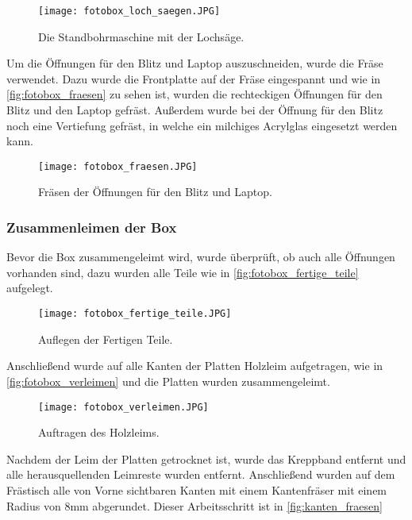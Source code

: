 \begin{figure}[H]
    \centering
    \texttt{[image: fotobox\_loch\_saegen.JPG]}
    \caption{Die Standbohrmaschine mit der Lochsäge.}
    \label{fig:fotobox_loch_saegen}
\end{figure}

Um die Öffnungen für den Blitz und Laptop auszuschneiden, wurde die Fräse verwendet.
Dazu wurde die Frontplatte auf der Fräse eingespannt und wie in
\autoref{fig:fotobox_fraesen} zu sehen ist, wurden die rechteckigen Öffnungen
für den Blitz und den Laptop gefräst. Außerdem wurde bei der Öffnung für den Blitz
noch eine Vertiefung gefräst, in welche ein milchiges Acrylglas eingesetzt werden kann.

\begin{figure}[H]
    \centering
    \texttt{[image: fotobox\_fraesen.JPG]}
    \caption{Fräsen der Öffnungen für den Blitz und Laptop.}
    \label{fig:fotobox_fraesen}
\end{figure}

\newpage

\subsubsection{Zusammenleimen der Box}

Bevor die Box zusammengeleimt wird, wurde überprüft, ob auch alle Öffnungen 
vorhanden sind, dazu wurden alle Teile wie in \autoref{fig:fotobox_fertige_teile}
aufgelegt. 

\begin{figure}[H]
    \centering
    \texttt{[image: fotobox\_fertige\_teile.JPG]}
    \caption{Auflegen der Fertigen Teile.}
    \label{fig:fotobox_fertige_teile}
\end{figure}

Anschließend wurde auf alle Kanten der Platten Holzleim aufgetragen, wie in 
\autoref{fig:fotobox_verleimen} und die Platten wurden zusammengeleimt.

\begin{figure}[H]
    \centering
    \texttt{[image: fotobox\_verleimen.JPG]}
    \caption{Auftragen des Holzleims.}
    \label{fig:fotobox_verleimen}
\end{figure}

\newpage

Nachdem der Leim der Platten getrocknet ist, wurde das Kreppband entfernt und
alle herausquellenden Leimreste wurden entfernt. Anschließend wurden auf 
dem Frästisch alle von Vorne sichtbaren Kanten mit einem Kantenfräser mit einem
Radius von 8mm abgerundet. Dieser Arbeitsschritt ist in \autoref{fig:kanten_fraesen}

